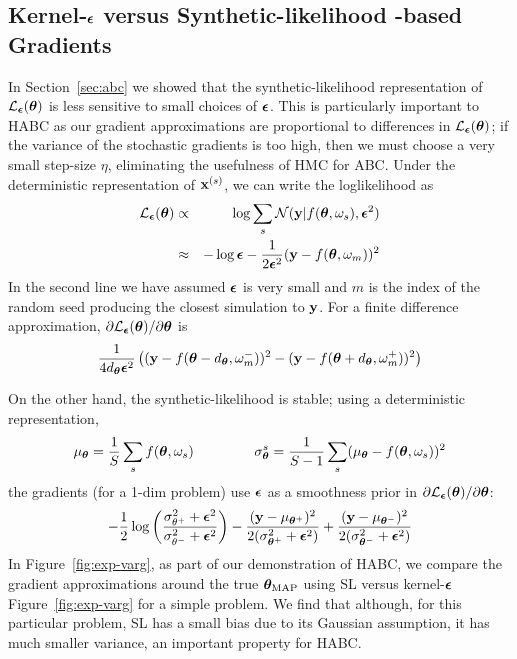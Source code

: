 \documentclass[]{article}
\begin{document}
\subsection{Kernel-${\bm {\epsilon}}$ versus Synthetic-likelihood -based Gradients}
In Section~\ref{sec:abc} we showed that the synthetic-likelihood representation of $\mathcal{L}_{{\bm {\epsilon}}}({\bm \theta})$ is less sensitive to small choices of ${\bm {\epsilon}}$.  This is particularly important to HABC as our gradient approximations are proportional to differences in $\mathcal{L}_{{\bm {\epsilon}}}({\bm \theta})$; if the variance of the stochastic gradients is too high, then we must choose a very small step-size $\eta$, eliminating the usefulness of HMC for ABC.  Under the deterministic representation of ${\bf x}^{(s)}$, we can write the loglikelihood as
\begin{eqnarray}
 \mathcal{L}_{{\bm {\epsilon}}}({\bm \theta}) & \propto & \log \sum_s \mathcal{N}( {\bf y} | f( {\bm \theta}, \omega_s), {\bm {\epsilon}}^2 )\\
                 & \approx & -\log {\bm {\epsilon}} -\frac{1}{2 {\bm {\epsilon}}^2} ( {\bf y} - f( {\bm \theta}, \omega_m) )^2 
\end{eqnarray}
In the second line we have assumed ${\bm {\epsilon}}$ is very small and $m$ is the index of the random seed producing the closest simulation to ${\bf y}$.  For a finite difference approximation, $\partial \mathcal{L}_{{\bm {\epsilon}}}({\bm \theta})/\partial{\bm \theta}$ is
\begin{equation}
 \frac{1}{4d_{{\bm \theta}} {\bm {\epsilon}}^2} \left( ( {\bf y} - f( {\bm \theta}-d_{{\bm \theta}}, \omega_m^-) )^2 -( {\bf y} - f( {\bm \theta} + d_{{\bm \theta}}, \omega_m^+) )^2 \right)
\end{equation}

On the other hand, the synthetic-likelihood is stable; using a deterministic representation, 
\begin{equation}
\mu_{{\bm \theta}} = \frac{1}{S} \sum_s f( {\bm \theta}, \omega_s ) ~~~~~~~~~~~~~ \sigma^s_{{\bm \theta}} = \frac{1}{S-1} \sum_s ( \mu_{{\bm \theta}} - f( {\bm \theta}, \omega_s ) )^2
\end{equation}
the gradients (for a 1-dim problem) use ${\bm {\epsilon}}$ as a smoothness prior in $\partial \mathcal{L}_{{\bm {\epsilon}}}({\bm \theta})/\partial{\bm \theta}$:
\begin{equation}
  -\frac{1}{2}\log\left(\frac{\sigma_{\theta^+}^2 + {\bm {\epsilon}}^2}{\sigma_{\theta^-}^2 + {\bm {\epsilon}}^2}\right) -\frac{( {\bf y} - \mu_{{\bm \theta}^+} )^2 }{2 (\sigma^2_{{\bm \theta}^+} + {\bm {\epsilon}}^2 )} +\frac{( {\bf y} - \mu_{{\bm \theta}^-} )^2 }{2 (\sigma^2_{{\bm \theta}^-} + {\bm {\epsilon}}^2 )} 
\end{equation} 
In Figure~\ref{fig:exp-varg}, as part of our demonstration of HABC, we compare the gradient approximations around the true ${\bm \theta}_{\text{MAP}}$ using SL versus kernel-${\bm {\epsilon}}$ Figure~\ref{fig:exp-varg} for a simple problem.  We find that although, for this particular problem, SL has a small bias due to its Gaussian assumption, it has much smaller variance, an important property for HABC.
\end{document}
